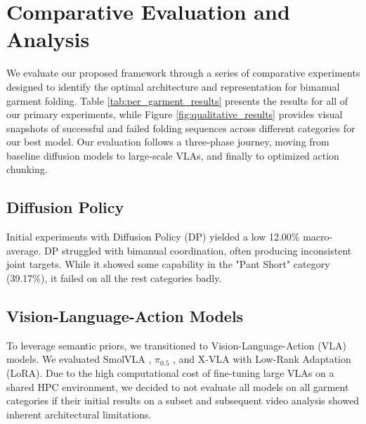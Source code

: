 \section{Comparative Evaluation and Analysis}
\label{sec:experiments}

We evaluate our proposed framework through a series of comparative experiments designed to identify the optimal architecture and representation for bimanual garment folding. Table \ref{tab:per_garment_results} presents the results for all of our primary experiments, while Figure \ref{fig:qualitative_results} provides visual snapshots of successful and failed folding sequences across different categories for our best model. Our evaluation follows a three-phase journey, moving from baseline diffusion models to large-scale VLAs, and finally to optimized action chunking.

\subsection{Diffusion Policy}
Initial experiments with Diffusion Policy (DP) \cite{chi2023diffusionpolicy} yielded a low 12.00\% macro-average. DP struggled with bimanual coordination, often producing inconsistent joint targets. While it showed some capability in the "Pant Short" category (39.17\%), it failed on all the rest categories badly.

\subsection{Vision-Language-Action Models}
To leverage semantic priors, we transitioned to Vision-Language-Action (VLA) models. We evaluated SmolVLA \cite{smolvla2025}, $\pi_{0.5}$ \cite{pi05_2026}, and X-VLA \cite{zheng2025xvlasoftpromptedtransformerscalable} with Low-Rank Adaptation (LoRA). Due to the high computational cost of fine-tuning large VLAs on a shared HPC environment, we decided to not evaluate all models on all garment categories if their initial results on a subset and subsequent video analysis showed inherent architectural limitations. 


